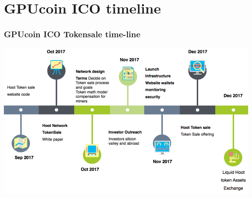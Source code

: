 \documentclass[10pt,handout]{beamer}
\begin{document}
\section{GPUcoin ICO timeline}
\begin{frame}[t]\frametitle{GPUcoin ICO Tokensale time-line}
 \includegraphics[width=1.0\textwidth]{static/tstimeline-trans}
\end{frame}
\end{document}
